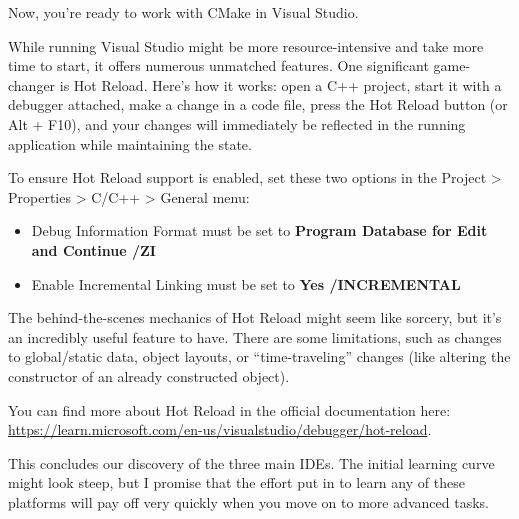 Now, you’re ready to work with CMake in Visual Studio.


While running Visual Studio might be more resource-intensive and take more time to start, it offers numerous unmatched features. One significant game-changer is Hot Reload. Here’s how it works: open a C++ project, start it with a debugger attached, make a change in a code file, press the Hot Reload button (or Alt + F10), and your changes will immediately be reflected in the running application while maintaining the state.

To ensure Hot Reload support is enabled, set these two options in the Project > Properties > C/C++ > General menu:

\begin{itemize}
\item
Debug Information Format must be set to \textbf{Program Database for Edit and Continue /ZI}

\item
Enable Incremental Linking must be set to \textbf{Yes /INCREMENTAL}
\end{itemize}

The behind-the-scenes mechanics of Hot Reload might seem like sorcery, but it’s an incredibly useful feature to have. There are some limitations, such as changes to global/static data, object layouts, or “time-traveling” changes (like altering the constructor of an already constructed object).

You can find more about Hot Reload in the official documentation here: \url{https://learn.microsoft.com/en-us/visualstudio/debugger/hot-reload}.

This concludes our discovery of the three main IDEs. The initial learning curve might look steep, but I promise that the effort put in to learn any of these platforms will pay off very quickly when you move on to more advanced tasks.















